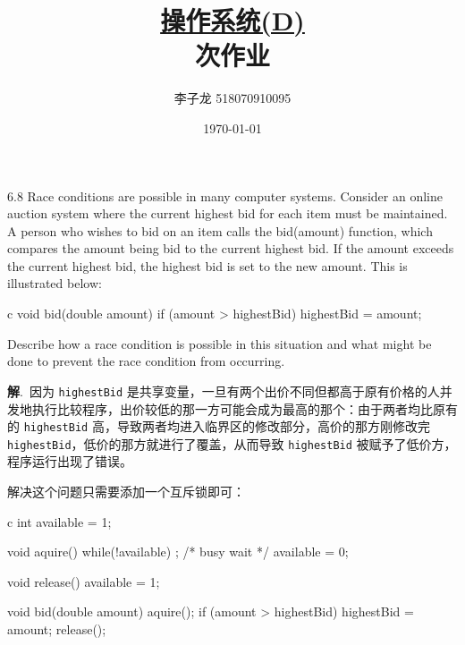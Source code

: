 \documentclass[12pt,a4paper]{article}
\newenvironment{problems}{\begin{list}{}{\renewcommand{\makelabel}[1]{\textbf{##1}\hfil}}}{\end{list}}
\providecommand{\sol}{\textbf{解}.~}
\begin{document}
\title{\normalsize \underline{操作系统(D)}\\ 次作业}
\author{李子龙 518070910095}
\date{\today}
\maketitle

\begin{problems}
    \item[6.8] Race conditions are possible in many computer systems. Consider an online auction system where the current highest bid for each item must be maintained. A person who wishes to bid on an item calls the bid(amount) function, which compares the amount being bid to the current highest bid. If the amount exceeds the current highest bid, the highest bid is set to the new amount. This is illustrated below:
    \begin{code}{c}
        void bid(double amount){
            if (amount > highestBid)      
                highestBid = amount;
        }
    \end{code} 
    Describe how a race condition is possible in this situation and what might be done to prevent the race condition from occurring.

    \sol 因为 \verb"highestBid" 是共享变量，一旦有两个出价不同但都高于原有价格的人并发地执行比较程序，出价较低的那一方可能会成为最高的那个：由于两者均比原有的 \verb"highestBid" 高，导致两者均进入临界区的修改部分，高价的那方刚修改完 \verb"highestBid"，低价的那方就进行了覆盖，从而导致 \verb"highestBid" 被赋予了低价方，程序运行出现了错误。

    解决这个问题只需要添加一个互斥锁即可：
    \begin{code}{c}
        int available = 1;

        void aquire(){
            while(!available)
                ;   /* busy wait */
            available = 0;
        }

        void release(){
            available = 1;
        }

        void bid(double amount){
            aquire();
            if (amount > highestBid)      
                highestBid = amount;
            release();
        }
    \end{code}


\end{problems}
\end{document}
